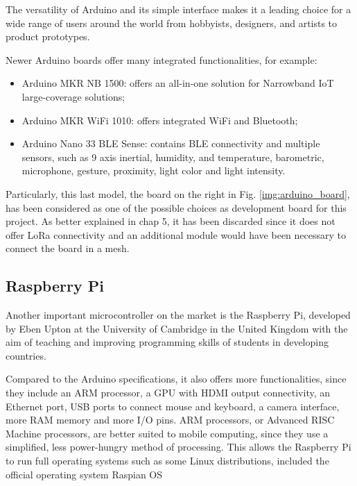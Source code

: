 		The versatility of Arduino and its simple interface makes it a leading choice for a wide range of users around the world from hobbyists, designers, and artists to product prototypes. 
		
		Newer Arduino boards offer many integrated functionalities, for example:
		\begin{itemize}[noitemsep]
			\item Arduino MKR NB 1500: offers an all-in-one solution for Narrowband IoT large-coverage solutions;
			\item Arduino MKR WiFi 1010: offers integrated WiFi and Bluetooth;
			\item Arduino Nano 33 BLE Sense: contains BLE connectivity and multiple sensors, such as 9 axis inertial, humidity, and temperature, barometric, microphone, gesture, proximity, light color and light intensity.
		\end{itemize}
	
		Particularly, this last model, the board on the right in Fig. \ref{img:arduino_board}, has been considered as one of the possible choices as development board for this project.
		As better explained in chap 5, it has been discarded since it does not offer LoRa connectivity and an additional module would have been necessary to connect the board in a mesh.
							
	\subsection{Raspberry Pi}

		Another important microcontroller on the market is the Raspberry Pi, developed by Eben Upton at the University of Cambridge in the United Kingdom with the aim of teaching and improving programming skills of students in developing countries.
		
		Compared to the Arduino specifications, it also offers more functionalities, since they include an ARM processor, a GPU with HDMI output connectivity, an Ethernet port, USB ports to connect mouse and keyboard, a camera interface, more RAM memory and more I/O pins.
		ARM processors, or Advanced RISC Machine processors, are better suited to mobile computing, since they use a simplified, less power-hungry method of processing.
		This allows the Raspberry Pi to run full operating systems such as some Linux distributions, included the official operating system Raspian OS
		

